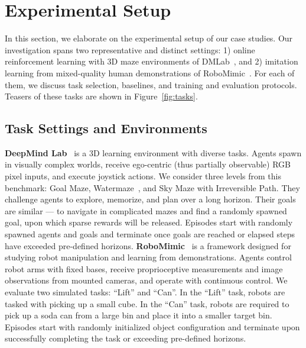 \documentclass{article}
\begin{document}
\section{Experimental Setup}
\label{sec:exp_setup}
In this section, we elaborate on the experimental setup of our case studies. Our investigation spans two representative and distinct settings:
1) online reinforcement learning with 3D maze environments of DMLab~\citep{beattie2016deepmind}, and 2) imitation learning from mixed-quality human demonstrations of RoboMimic~\citep{mandlekar2021matters}. For each of them, we discuss task selection, baselines, and training and evaluation protocols.
Teasers of these tasks are shown in Figure~\ref{fig:tasks}.
\subsection{Task Settings and Environments}
\textbf{DeepMind Lab}~\citep{beattie2016deepmind} is a 3D learning environment with diverse tasks.
Agents spawn in visually complex worlds, receive ego-centric (thus partially observable) RGB pixel inputs, and execute joystick actions. We consider three levels from this benchmark: Goal Maze, Watermaze~\citep{watermaze}, and Sky Maze with Irreversible Path. They challenge agents to explore, memorize, and plan over a long horizon. Their goals are similar --- to navigate in complicated mazes and find a randomly spawned goal, upon which sparse rewards will be released.
Episodes start with randomly spawned agents and goals and terminate once goals are reached or elapsed steps have exceeded pre-defined horizons.
\textbf{RoboMimic}~\citep{mandlekar2021matters} is a framework designed for studying robot manipulation and learning from demonstrations. Agents control robot arms with fixed bases, receive proprioceptive measurements and image observations from mounted cameras, and operate with continuous control.
We evaluate two simulated tasks: ``Lift'' and ``Can''. In the ``Lift'' task, robots are tasked with picking up a small cube. In the ``Can'' task, robots are required to pick up a soda can from a large bin and place it into a smaller target bin.
Episodes start with randomly initialized object configuration and terminate upon successfully completing the task or exceeding pre-defined horizons.

\end{document}
